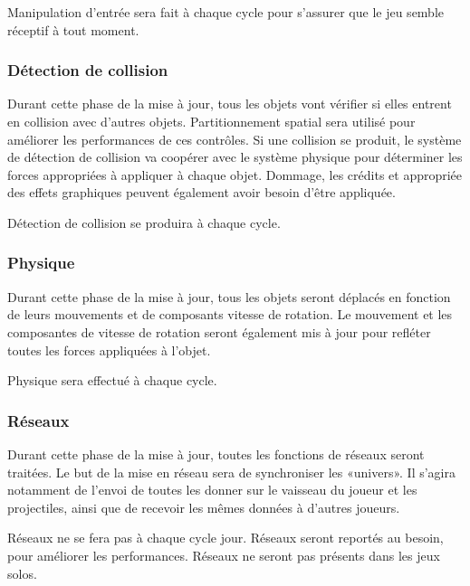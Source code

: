Manipulation d'entrée sera fait à chaque cycle  pour s'assurer que le jeu semble réceptif à tout moment.


\subsubsection{Détection de collision} %
\label{ssub:détection_de_collision}

Durant cette phase de la mise à jour, tous les objets vont vérifier si elles entrent en collision avec d'autres objets. Partitionnement spatial sera utilisé pour améliorer les performances de ces contrôles. Si une collision se produit, le système de détection de collision va coopérer avec le système physique pour déterminer les forces appropriées à appliquer à chaque objet. Dommage, les crédits et appropriée des effets graphiques peuvent également avoir besoin d'être appliquée. 

Détection de collision se produira à chaque cycle.


\subsubsection{Physique} %
\label{ssub:physique}

Durant cette phase de la mise à jour, tous les objets seront déplacés en fonction de leurs mouvements et de composants vitesse de rotation. Le mouvement et les composantes de vitesse de rotation seront également mis à jour pour refléter toutes les forces appliquées à l'objet. 

Physique sera effectué à chaque cycle.


\subsubsection{Réseaux} %
\label{ssub:réseau}

Durant cette phase de la mise à jour, toutes les fonctions de réseaux seront traitées. Le but de la mise en réseau sera de synchroniser les «univers». Il s'agira notamment de l'envoi de toutes les donner sur le vaisseau du joueur et les projectiles, ainsi que de recevoir les mêmes données à d'autres joueurs. 

Réseaux ne se fera pas à chaque cycle jour. Réseaux seront reportés au besoin, pour améliorer les performances. Réseaux ne seront pas présents dans les jeux solos.

